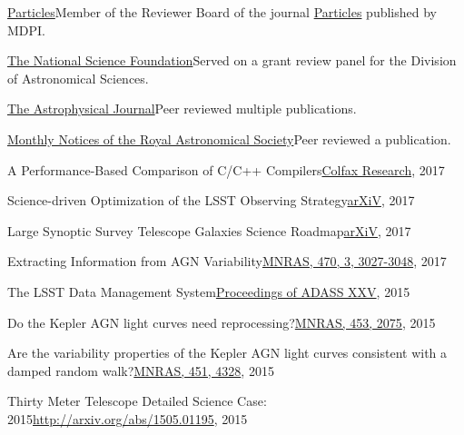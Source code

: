 \documentclass[10pt,a4paper]{article}
\begin{document}
\spacedhrule{2.0em}{0.2em}


\inlineheadsection
  {\href{https://www.mdpi.com/journal/particles/submission_reviewers}{Particles}}{Member of the Reviewer Board of the journal \href{https://www.mdpi.com/journal/particles}{Particles} published by MDPI.}

\inlineheadsection
  {\href{https://www.nsf.gov/}{The National Science Foundation}}{Served on a grant review panel for the Division of Astronomical Sciences.}

\inlineheadsection
  {\href{http://iopscience.iop.org/journal/0004-637X}{The Astrophysical Journal}}{Peer reviewed multiple publications.}

\inlineheadsection
  {\href{https://academic.oup.com/mnras}{Monthly Notices of the Royal Astronomical Society}}{Peer reviewed a publication.}

\spacedhrule{2.0em}{0.2em}

\pagebreak


\inlineheadsection
  {A Performance-Based Comparison of C/C++ Compilers}{\href{https://colfaxresearch.com/compiler-comparison/}{Colfax Research}, 2017}

\inlineheadsection
  {Science-driven Optimization of the LSST Observing Strategy}{\href{https://arxiv.org/abs/1708.04058}{arXiV}, 2017}

\inlineheadsection
  {Large Synoptic Survey Telescope Galaxies Science Roadmap}{\href{https://arxiv.org/abs/1708.01617}{arXiV}, 2017}

\inlineheadsection
  {Extracting Information from AGN Variability}{\href{https://doi.org/10.1093/mnras/stx1420}{MNRAS, 470, 3, 3027-3048}, 2017}

\inlineheadsection
  {The LSST Data Management System}{\href{http://adsabs.harvard.edu/cgi-bin/bib_query?arXiv:1512.07914}{Proceedings of ADASS XXV}, 2015}

\inlineheadsection
  {Do the Kepler AGN light curves need reprocessing?}{\href{http://dx.doi.org/10.1093/mnras/stv1797}{MNRAS, 453, 2075}, 2015}

\inlineheadsection
  {Are the variability properties of the Kepler AGN light curves consistent with a damped random walk?}{\href{http://dx.doi.org/ 10.1093/mnras/stv1230}{MNRAS, 451, 4328}, 2015}

\inlineheadsection
 {Thirty Meter Telescope Detailed Science Case: 2015}{\href{http://arxiv.org/abs/1505.01195}{http://arxiv.org/abs/1505.01195}, 2015}
\end{document}
